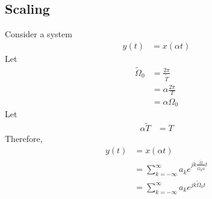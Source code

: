 \documentclass[titlepage, fleqn, a4paper, 12pt, twoside]{article}
\theoremstyle{definition}
\theoremstyle{theorem}
\renewcommand{\tilde}{\widetilde}
\begin{document}
\subsection{Scaling}

Consider a system
\begin{align*}
	y(t) &= x(\alpha t)
\end{align*}
Let
\begin{align*}
	\tilde{\Omega}_0 &= \frac{2 \pi}{\tilde{T}}\\
	&= \alpha \frac{2 \pi}{T}\\
	&= \alpha \Omega_0
\end{align*}
Let
\begin{align*}
	\alpha \tilde{T} &= T
\end{align*}
Therefore,
\begin{align*}
	y(t) &= x(\alpha t)\\
	&= \sum\limits_{k = -\infty}^{\infty} a_k e^{j k \frac{\tilde{\Omega}}{\tilde{\Omega}_0 \alpha} t}\\
	&= \sum\limits_{k = -\infty}^{\infty} a_k e^{j k \tilde{\Omega}_0 t}
\end{align*}
\end{document}
